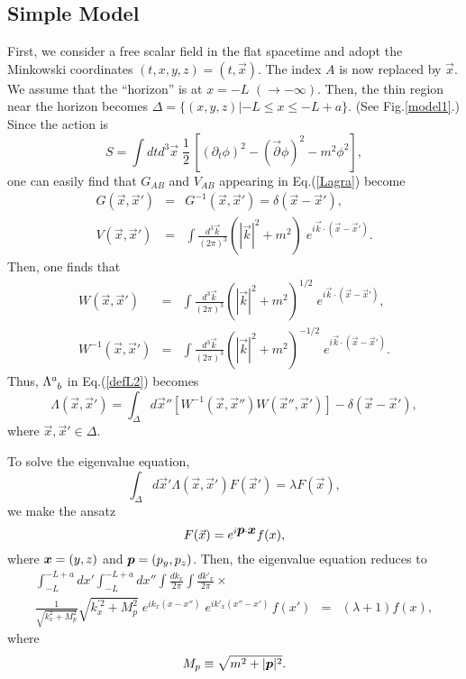 \subsection{Simple Model}
First, we consider a free scalar field in the flat spacetime and
adopt the Minkowski coordinates $(t,x,y,z)=(t,\vec{x})$.
The index $A$ is now replaced by $\vec{x}$.
We assume that the ``horizon'' is at $x=-L$ $(\to-\infty)$.
Then, the thin region near the horizon becomes
$\Delta=\{(x,y,z) | -L\le x \le -L+a \}$.
(See Fig.\ref{model1}.)
Since the action is
\begin{equation}
  S=\int dtd^3\vec{x}\; \frac{1}{2} \,
  \left[ (\partial_t\phi)^2-
         (\vec{\partial}\phi)^2-m^2\phi^2 \right],
\end{equation}
one can easily find that $G_{AB}$ and $V_{AB}$ appearing
in Eq.(\ref{Lagra}) become~\cite{BKLS86}
\begin{eqnarray}
  G(\vec{x},\vec{x}')&=& G^{-1}(\vec{x},\vec{x}')=
                          \delta(\vec{x}-\vec{x}'), \\
  V(\vec{x},\vec{x}')&=&\int\frac{d^3\vec{k}}{(2\pi)^3}
    \left(|\vec{k}|^2+m^2\right)
   \;e^{i\vec{k}\cdot (\vec{x}-\vec{x}')}.
\end{eqnarray}
Then, one finds that
\begin{eqnarray}
  W(\vec{x},\vec{x}') &=& \int\frac{d^3\vec{k}}{(2\pi)^3}
    \left(|\vec{k}|^2+m^2\right)^{1/2}
   \;e^{i\vec{k}\cdot (\vec{x}-\vec{x}')}, \\
  W^{-1}(\vec{x},\vec{x}')&=&\int\frac{d^3\vec{k}}{(2\pi)^3}
    \left(|\vec{k}|^2+m^2\right)^{-1/2}
   \;e^{i\vec{k}\cdot (\vec{x}-\vec{x}')}.
\end{eqnarray}
Thus, $\Lambda^a_{\sp b}$ in Eq.(\ref{defL2}) becomes
\begin{equation}
  \Lambda(\vec{x},\vec{x}') = 
   \int_\Delta d\vec{x}'' \left[ W^{-1}(\vec{x},\vec{x}'')
    W(\vec{x}'',\vec{x}')  \right]
  -\delta(\vec{x}-\vec{x}'),
\end{equation}
where $\vec{x},\vec{x}'\in \Delta$.

To solve the eigenvalue equation,
\begin{equation}
  \int_\Delta d\vec{x}' \Lambda(\vec{x},\vec{x}') F(\vec{x}')
   =\lambda  F(\vec{x}),
\end{equation}
we make the ansatz
\begin{equation}
  F(\vec{x}) = e^{i\mbox{\boldmath $p$}\cdot\mbox{\boldmath $x$}} f(x),
\end{equation}
where $\mbox{\boldmath $x$}=(y,z)$ and $\mbox{\boldmath $p$}=(p_y,p_z)$.
Then, the eigenvalue equation reduces to
\begin{eqnarray}
  \int^{-L+a}_{-L} dx' \int^{-L+a}_{-L} dx''
  \int \frac{dk_x}{2\pi}\int \frac{dk'_x}{2\pi}
   \times \qquad\qquad\quad
   & & \nonumber \\
  \frac{1}{\sqrt{k_x^2+M_p^2}}\sqrt{k_x^{'2}+M_p^2}
  \;e^{ik_x(x-x'')}\;e^{ik'_x(x''-x')}\, f(x')
   &=&  (\lambda+1) f(x),
\end{eqnarray}
where
\begin{equation}
 M_p  \equiv \sqrt{m^2+|\mbox{\boldmath $p$}|^2}.
\end{equation}


